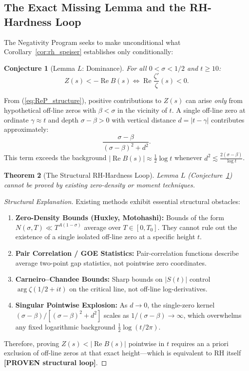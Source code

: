 \documentclass[11pt,a4paper]{article}
\newtheorem{theorem}{Theorem}[section]
\newtheorem{conjecture}[theorem]{Conjecture}
\theoremstyle{remark}
\newcommand{\Ree}{\operatorname{Re}}
\begin{document}
\subsection{The Exact Missing Lemma and the RH-Hardness Loop}
The Negativity Program seeks to make unconditional what Corollary~\ref{cor:rh_speiser} establishes only conditionally:
\begin{conjecture}[Lemma $L$: Dominance]\label{conj:L}
For all $0 < \sigma < 1/2$ and $t \ge 10$:
\[
 Z(s) < -\Ree B(s) \iff \Ree\frac{\zeta'}{\zeta}(s) < 0.
\]
\end{conjecture}
From (\ref{eq:ReP_structure}), positive contributions to $Z(s)$ can arise \emph{only} from hypothetical off-line zeros with $\beta < \sigma$ in the vicinity of $t$. A single off-line zero at ordinate $\gamma \approx t$ and depth $\sigma - \beta > 0$ with vertical distance $d = |t - \gamma|$ contributes approximately:
\[
 \frac{\sigma - \beta}{(\sigma - \beta)^2 + d^2}.
\]
This term exceeds the background $|\Ree B(s)| \approx \frac{1}{2}\log t$ whenever $d^2 \lesssim \frac{2(\sigma - \beta)}{\log t}$.

\begin{theorem}[The Structural RH-Hardness Loop]\label{thm:hardness_loop}
Lemma $L$ (Conjecture~\ref{conj:L}) cannot be proved by existing zero-density or moment techniques.
\end{theorem}
\begin{proof}[Structural Explanation]
Existing methods exhibit essential structural obstacles:
\begin{enumerate}
\item \textbf{Zero-Density Bounds (Huxley, Motohashi):} Bounds of the form $N(\sigma, T) \ll T^{A(1-\sigma)}$ average over $T \in [0, T_0]$. They cannot rule out the existence of a single isolated off-line zero at a specific height $t$.
\item \textbf{Pair Correlation / GOE Statistics:} Pair-correlation functions describe average two-point gap statistics, not pointwise zero coordinates.
\item \textbf{Carneiro--Chandee Bounds:} Sharp bounds on $|S(t)|$ control $\arg\zeta(1/2+it)$ on the critical line, not off-line log-derivatives.
\item \textbf{Singular Pointwise Explosion:} As $d \to 0$, the single-zero kernel $(\sigma - \beta)/[(\sigma - \beta)^2 + d^2]$ scales as $1/(\sigma - \beta) \to \infty$, which overwhelms any fixed logarithmic background $\frac{1}{2}\log(t/2\pi)$.
\end{enumerate}
Therefore, proving $Z(s) < |\Ree B(s)|$ pointwise in $t$ requires an a priori exclusion of off-line zeros at that exact height---which is equivalent to RH itself \textbf{[PROVEN structural loop]}.
\end{proof}
\end{document}
